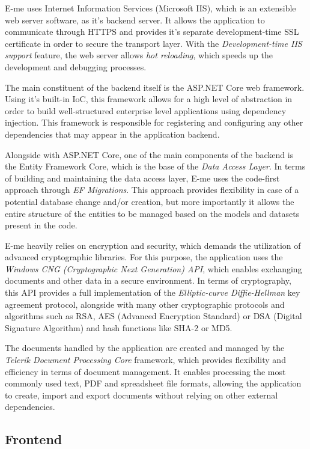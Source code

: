 E-me uses Internet Information Services (Microsoft IIS), which is an extensible web server software, as it's backend server.
It allows the application to communicate through HTTPS and provides it's separate development-time SSL certificate in order to secure the transport
layer. With the \emph{Development-time IIS support} feature, the web server allows \emph{hot reloading}, which speeds up the development and debugging
processes.

The main constituent of the backend itself is the ASP.NET Core web framework.
Using it's built-in IoC, this framework allows for a high level of abstraction in order to build well-structured enterprise level applications
using dependency injection.
This framework is responsible for registering and configuring any other dependencies that may appear in the application backend.

Alongside with ASP.NET Core, one of the main components of the backend is the Entity Framework Core, which is the base of the 
\emph{Data Access Layer}.
In terms of building and maintaining the data access layer, E-me uses the code-first approach through \emph{EF Migrations}.
This approach provides flexibility in case of a potential database change and/or creation, but more importantly it allows 
the entire structure of the entities to be managed based on the models and datasets present in the code.

E-me heavily relies on encryption and security, which demands the utilization of advanced cryptographic libraries.
For this purpose, the application uses the \emph{Windows CNG (Cryptographic Next Generation) API}, which
enables exchanging documents and other data in a secure environment.
In terms of cryptography, this API provides a full implementation of the \emph{Elliptic-curve Diffie-Hellman} key agreement protocol,
alongside with many other cryptographic protocols and algorithms such as RSA, AES (Advanced Encryption Standard) or DSA (Digital Signature Algorithm)
and hash functions like SHA-2 or MD5.

The documents handled by the application are created and managed by the \emph{Telerik Document Processing Core} framework, which
provides flexibility and efficiency in terms of document management. 
It enables processing the most commonly used text, PDF and spreadsheet file formats, allowing the application
to create, import and export documents without relying on other external dependencies.

\subsection{Frontend}

